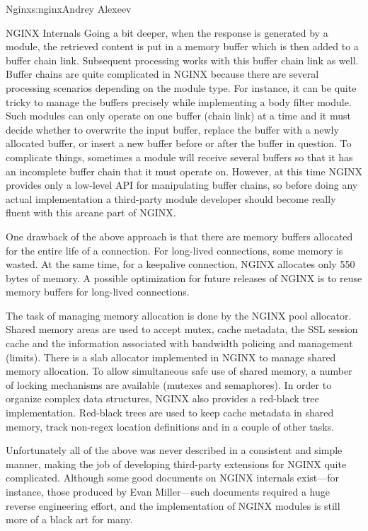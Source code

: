 \begin{aosachapter}{Nginx}{s:nginx}{Andrey Alexeev}
\begin{aosasect1}{NGINX Internals}
Going a bit deeper, when the response is generated by a module, the
retrieved content is put in a memory buffer which is then added to a
buffer chain link. Subsequent processing works with this buffer chain
link as well. Buffer chains are quite complicated in NGINX because
there are several processing scenarios depending on the module
type. For instance, it can be quite tricky to manage the buffers
precisely while implementing a body filter module. Such modules can
only operate on one buffer (chain link) at a time and it must decide
whether to overwrite the input buffer, replace the buffer with a newly
allocated buffer, or insert a new buffer before or after the buffer in
question. To complicate things, sometimes a module will receive
several buffers so that it has an incomplete buffer chain that it must
operate on. However, at this time NGINX provides only a low-level API
for manipulating buffer chains, so before doing any actual
implementation a third-party module developer should become really
fluent with this arcane part of NGINX.

One drawback of the above approach is that there are memory buffers
allocated for the entire life of a connection. For long-lived
connections, some memory is wasted. At the same time, for a keepalive
connection, NGINX allocates only 550 bytes of memory. A possible
optimization for future releases of NGINX is to reuse memory buffers
for long-lived connections.

The task of managing memory allocation is done by the NGINX pool
allocator. Shared memory areas are used to accept mutex, cache
metadata, the SSL session cache and the information associated with
bandwidth policing and management (limits). There is a slab allocator
implemented in NGINX to manage shared memory allocation. To allow
simultaneous safe use of shared memory, a number of locking mechanisms
are available (mutexes and semaphores). In order to organize complex
data structures, NGINX also provides a red-black tree
implementation. Red-black trees are used to keep cache metadata in
shared memory, track non-regex location definitions and in a couple of
other tasks.

Unfortunately all of the above was never described in a consistent and
simple manner, making the job of developing third-party extensions for
NGINX quite complicated. Although some good documents on NGINX
internals exist---for instance, those produced by Evan Miller---such
documents required a huge reverse engineering effort, and the
implementation of NGINX modules is still more of a black art for many.


\end{aosasect1}
\end{aosachapter}
